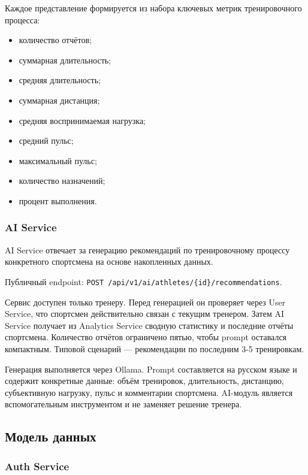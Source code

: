 Каждое представление формируется из набора ключевых метрик тренировочного процесса:

\begin{itemize}
\tightlist
\item
  количество отчётов;
\item
  суммарная длительность;
\item
  средняя длительность;
\item
  суммарная дистанция;
\item
  средняя воспринимаемая нагрузка;
\item
  средний пульс;
\item
  максимальный пульс;
\item
  количество назначений;
\item
  процент выполнения.
\end{itemize}

\subsubsection{AI Service}

AI Service отвечает за генерацию рекомендаций по тренировочному процессу конкретного спортсмена на основе накопленных данных.

Публичный endpoint: \lstinline!POST /api/v1/ai/athletes/{id}/recommendations!.

Сервис доступен только тренеру. Перед генерацией он проверяет через User Service, что спортсмен действительно связан с текущим тренером. Затем AI Service получает из Analytics Service сводную статистику и последние отчёты спортсмена. Количество отчётов ограничено пятью, чтобы prompt оставался компактным. Типовой сценарий --- рекомендации по последним 3-5 тренировкам.

Генерация выполняется через Ollama. Prompt составляется на русском языке и содержит конкретные данные: объём тренировок, длительность, дистанцию, субъективную нагрузку, пульс и комментарии спортсмена. AI-модуль является вспомогательным инструментом и не заменяет решение тренера.

\subsection{Модель данных}

\subsubsection{Auth Service}

